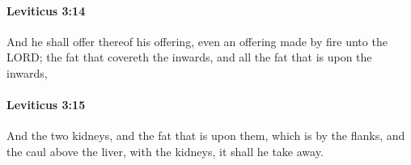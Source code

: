 		\paragraph{Leviticus 3:14} %
			\label{LEVITICUS-3-14}

			And he shall offer thereof his offering, even an offering made by fire unto the LORD; the fat that covereth the inwards, and all the fat that is upon the inwards,


		\paragraph{Leviticus 3:15} %
			\label{LEVITICUS-3-15}

			And the two kidneys, and the fat that is upon them, which is by the flanks, and the caul above the liver, with the kidneys, it shall he take away.



